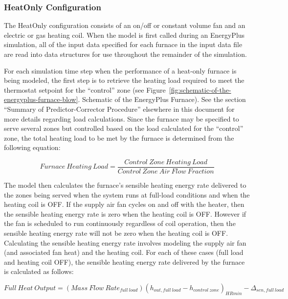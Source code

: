 \subsubsection{HeatOnly Configuration}\label{heatonly-configuration}

The HeatOnly configuration consists of an on/off or constant volume fan and an electric or gas heating coil. When the model is first called during an EnergyPlus simulation, all of the input data specified for each furnace in the input data file are read into data structures for use throughout the remainder of the simulation.

For each simulation time step when the performance of a heat-only furnace is being modeled, the first step is to retrieve the heating load required to meet the thermostat setpoint for the ``control'' zone (see Figure~\ref{fig:schematic-of-the-energyplus-furnace-blow}. Schematic of the EnergyPlus Furnace). See the section ``Summary of Predictor-Corrector Procedure'' elsewhere in this document for more details regarding load calculations. Since the furnace may be specified to serve several zones but controlled based on the load calculated for the ``control'' zone, the total heating load to be met by the furnace is determined from the following equation:

\begin{equation}
Furnace~Heating~Load = \frac{{Control~Zone~Heating~Load}}{{Control~Zone~Air~Flow~Fraction}}
\end{equation}

The model then calculates the furnace's sensible heating energy rate delivered to the zones being served when the system runs at full-load conditions and when the heating coil is OFF. If the supply air fan cycles on and off with the heater, then the sensible heating energy rate is zero when the heating coil is OFF. However if the fan is scheduled to run continuously regardless of coil operation, then the sensible heating energy rate will not be zero when the heating coil is OFF. Calculating the sensible heating energy rate involves modeling the supply air fan (and associated fan heat) and the heating coil. For each of these cases (full load and heating coil OFF), the sensible heating energy rate delivered by the furnace is calculated as follows:

\begin{equation}
Full~Heat~Output = (Mass~Flow~Rat{e_{full~load}}){({h_{out,full~load}} - {h_{control~zone}})_{HRmin}} - {\Delta_{sen,full~load}}
\end{equation}

